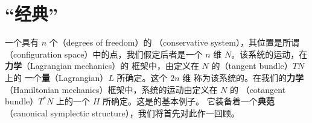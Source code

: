 

\section{“经典”\trHamiltonianSystem}
\label{sec:classical-hamiltonian-systems}


一个具有 $n$ 个\textbf{\trDegreesOfFreedom}（degrees of freedom）的\textbf{\trConservativeSystem}%
（conservative system），其位置是所谓\textbf{\trConfigurationSpace}%
（configuration space）中的点，我们假定后者是一个 $n$ 维\trSmooth\trManifold{}%
$N$。该系统的运动，在\textbf{\trLagrange{}力学}（Lagrangian mechanics）的%
框架中，由定义在 $N$ 的\textbf{\trTangentBundle}（tangent bundle）$TN$ 上的%
一个\textbf{\trLagrange{}量}（Lagrangian）$L$ 所确定。这个 $2n$ 维%
\trManifold{}称为该系统的\trPhaseSpace。在我们的\textbf{\trHamiltonian{}力学}%
（Hamiltonian mechanics）框架中，系统的运动由定义在 $N$ 的%
\textbf{\trCotangentBundle}（cotangent bundle）$T^{*}N$ 上的一个%
\trHamiltonianFunction{} $H$ 所确定。这是\trSymplecticManifold{}的基本例子。%
它装备着一个\textbf{典范\trSymplecticStructure}（canonical symplectic
structure），我们将首先对此作一回顾。

